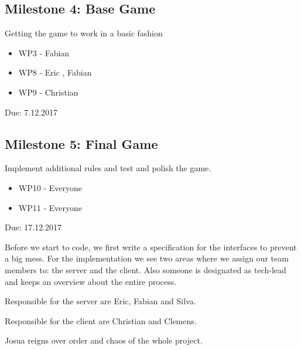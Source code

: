 \documentclass{sig-alternate}
\begin{document}
\subsection{Milestone 4: Base Game}
Getting the game to work in a basic fashion
\begin{itemize}
	\item WP3 - Fabian
	\item WP8 - Eric , Fabian
	\item WP9 - Christian
\end{itemize}
Due: 7.12.2017

\subsection{Milestone 5: Final Game}
Implement additional rules and test and polish the game.
\begin{itemize}
	\item WP10 - Everyone
	\item WP11 - Everyone
\end{itemize}
Due: 17.12.2017\medskip

Before we start to code, we first write a specification for the interfaces to prevent a big mess. For the implementation we see two areas where we assign our team members to: the server and the client. Also someone is designated as tech-lead and keeps an overview about the entire process.\smallskip

\noindent Responsible for the server are Eric, Fabian and Silva.

\noindent Responsible for the client are Christian and Clemens.

\noindent Josua reigns over order and chaos of the whole project.





\end{document}
